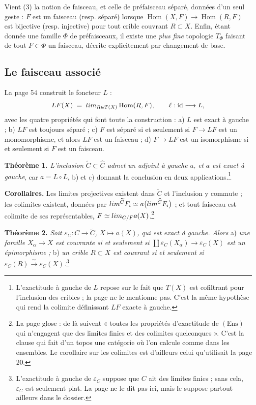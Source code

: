 \documentclass[11pt,a4paper]{article}
\begin{document}
Vient (3) la notion de faisceau, et celle de préfaisceau séparé, données d'un
seul geste : $F$ est un faisceau (resp. séparé) lorsque
$\operatorname{Hom}(X,F) \to \operatorname{Hom}(R,F)$ est bijective (resp.
injective) pour tout crible couvrant $R \subset X$. Enfin, étant donnée une
famille $\Phi$ de préfaisceaux, il existe une \emph{plus fine} topologie
$T_{\Phi}$ faisant de tout $F \in \Phi$ un faisceau, décrite explicitement par
changement de base.

\subsection*{Le faisceau associé}

La page 54 construit le foncteur $L$ :
\[
LF(X) \;=\; \varinjlim_{R \in T(X)} \operatorname{Hom}(R, F),
\qquad \ell : \mathrm{id} \longrightarrow L,
\]
avec les quatre propriétés qui font toute la construction : a) $L$ est exact à
gauche ; b) $LF$ est toujours séparé ; c) $F$ est séparé si et seulement si
$F \to LF$ est un monomorphisme, et alors $LF$ est un faisceau ; d) $F \to LF$
est un isomorphisme si et seulement si $F$ est un faisceau.

\textbf{Théorème 1.} \emph{L'inclusion $\widetilde{C} \subset \widehat{C}$
admet un adjoint à gauche $a$, et $a$ est exact à gauche}, car $a = L \circ L$,
b) et c) donnant la conclusion en deux applications.\footnote{L'exactitude à
gauche de $L$ repose sur le fait que $T(X)$ est cofiltrant pour l'inclusion des
cribles ; la page ne le mentionne pas. C'est la même hypothèse qui rend la
colimite définissant $LF$ exacte à gauche.}

\textbf{Corollaires.} Les limites projectives existent dans $\widetilde{C}$ et
l'inclusion y commute ; les colimites existent, données par
$\varinjlim^{\widetilde{C}} F_{i} \simeq a\bigl(\varinjlim^{\widehat{C}}
F_{i}\bigr)$ ; et tout faisceau est colimite de ses représentables,
$F \simeq \varinjlim_{C/F} a(X)$.\footnote{La page glose : de là suivent
« toutes les propriétés d'exactitude de
$(\mathrm{Ens})$ qui n'engagent que des limites finies et des colimites
quelconques ». C'est la clause qui fait d'un topos une catégorie où
l'on calcule comme dans les ensembles. Le corollaire sur les colimites est
d'ailleurs celui qu'utilisait la page 20.}

\textbf{Théorème 2.} \emph{Soit $\varepsilon_{C} : C \to \widetilde{C}$,
$X \mapsto a(X)$, qui est exact à gauche. Alors} a) \emph{une famille
$X_{\alpha} \to X$ est couvrante si et seulement si
$\coprod \varepsilon_{C}(X_{\alpha}) \to \varepsilon_{C}(X)$ est un
épimorphisme ;} b) \emph{un crible $R \subset X$ est couvrant si et seulement
si $\varepsilon_{C}(R) \xrightarrow{\ \sim\ } \varepsilon_{C}(X)$.}\footnote{L'exactitude
à gauche de $\varepsilon_{C}$ suppose que $C$ ait des limites finies ; sans
cela, $\varepsilon_{C}$ est seulement plat. La page ne le dit pas ici, mais le
suppose partout ailleurs dans le dossier.}
\end{document}
